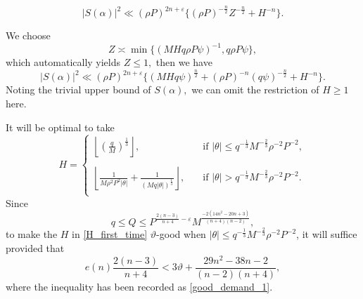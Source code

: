 \documentclass[12pt]{amsart}
\theoremstyle{definition}
\numberwithin{equation}{section}
\begin{document}

\begin{equation*}
    \left|S(\alpha)\right|^2 \ll (\rho P)^{2n+\varepsilon}\{(\rho P)^{-\frac{n}{2}}Z^{-\frac{n}{2}}+H^{-n}\}.
\end{equation*}

We choose
\begin{equation*}
    Z\asymp \min \{(MHq\rho P \psi)^{-1}, q\rho P \psi\},
\end{equation*}
which automatically yields $Z \leq 1,$
then we have
\begin{equation}
    \label{S(alpha)_van_der_Corput}
    \left|S(\alpha)\right|^2 \ll (\rho P)^{2n+\varepsilon}\{(MHq\psi)^{\frac{n}{2}}+(\rho P)^{-n}(q\psi)^{-\frac{n}{2}}+H^{-n}\}.
\end{equation}
Noting the trivial upper bound of $S(\alpha),$ we can omit the restriction of $H \geq 1$ here.

It will be optimal to take
\begin{equation}
    \label{H_first_time}
    H= 
    \begin{cases}
        \left\lfloor \left(\frac{q}{M}\right)^{\frac{1}{3}} \right\rfloor,\quad &\text{if }|\theta| \leq q^{-\frac{1}{3}}M^{-\frac{2}{3}}\rho^{-2}P^{-2},\\
                \\
         \left\lfloor \frac{1}{M\rho^2P^2|\theta|}+\frac{1}{(Mq|\theta|)^{\frac{1}{3}}}\right\rfloor,\quad &\text{if }|\theta| > q^{-\frac{1}{3}}M^{-\frac{2}{3}}\rho^{-2}P^{-2}.\\
    \end{cases}
\end{equation}
Since 
$$
q\leq Q \leq P^{\frac{2(n-3)}{n+4}-\varepsilon}M^{\frac{-2(14n^2-20n+3)}{(n+4)(n-2)}},
$$
to make the $H$ in \eqref{H_first_time} $\vartheta$-good when $|\theta| \leq q^{-\frac{1}{3}}M^{-\frac{2}{3}}\rho^{-2}P^{-2}$, it will suffice provided that 
\begin{equation*}
    e(n)\frac{2(n-3)}{n+4}< 3\vartheta+\frac{29n^2-38n-2}{(n-2)(n+4)},
\end{equation*}
where the inequality has been recorded as \eqref{good_demand_1}.
\end{document}
